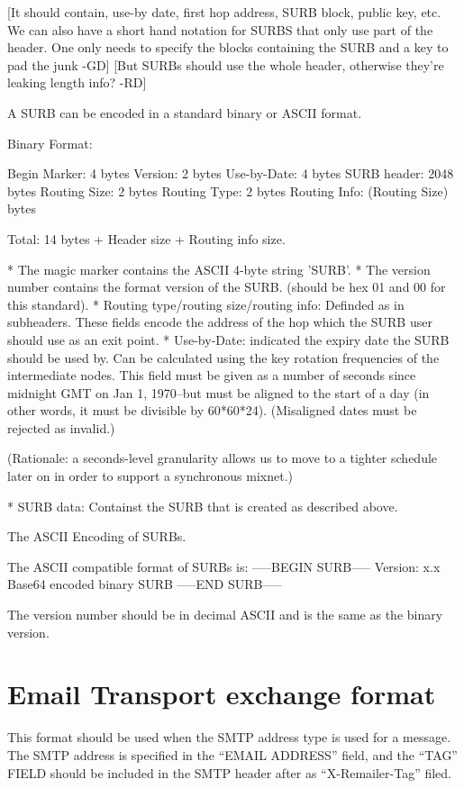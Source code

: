 [It should contain, use-by date, first hop address, 
 SURB block, public key, etc.
 We can also have a short hand notation for SURBS that only
 use part of the header. One only needs to specify the 
 blocks containing the SURB and a key to pad the junk -GD]
 [But SURBs should use the whole header, otherwise they're
  leaking length info? -RD]


A SURB can be encoded in a standard binary or ASCII format.

Binary Format:

   Begin Marker: 4 bytes
   Version:      2 bytes
   Use-by-Date:  4 bytes
   SURB header:  2048 bytes
   Routing Size: 2 bytes
   Routing Type: 2 bytes
   Routing Info: (Routing Size) bytes

   Total: 14 bytes + Header size + Routing info size.

* The magic marker contains the ASCII 4-byte string 'SURB'. 
* The version number contains the format version of the SURB.
  (should be hex 01 and 00 for this standard).
* Routing type/routing size/routing info: Definded as in subheaders.  
  These fields encode the address of the hop which the SURB user should
  use as an exit point.
* Use-by-Date: indicated the expiry date the SURB should be used by. Can
  be calculated using the key rotation frequencies of the intermediate
  nodes.  This field must be given as a number of seconds since
  midnight GMT on Jan 1, 1970--but must be aligned to the start of a
  day (in other words, it must be divisible by 60*60*24).
  (Misaligned dates must be rejected as invalid.)

  (Rationale: a seconds-level granularity allows us to move to a
  tighter schedule later on in order to support a synchronous mixnet.)

* SURB data: Containst the SURB that is created as described
  above. 

The ASCII Encoding of SURBs.

The  ASCII compatible format of SURBs is:
-----BEGIN SURB-----
Version: x.x
Base64 encoded binary SURB 
-----END SURB-----

The version number should be in decimal ASCII and is the same as the
binary version.

\section{Email Transport exchange format}

This format should be used when the SMTP address type is used for a
message. The SMTP address is specified in the ``EMAIL ADDRESS'' field,
and the ``TAG'' FIELD should be included in the SMTP header after as
``X-Remailer-Tag'' filed.

